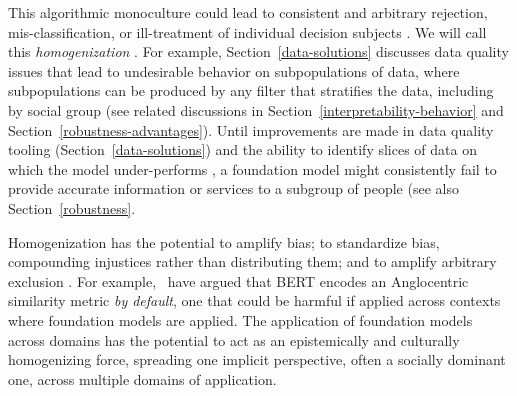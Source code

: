 This algorithmic monoculture \citep{kleinberg2021} could lead to consistent and arbitrary rejection, mis-classification, or ill-treatment of individual decision subjects \citep{Gandy2021}. We will call this \textit{homogenization} \citep{creel2021}. For example, Section~\ref{data-solutions} discusses data quality issues that lead to undesirable behavior on subpopulations of data, where subpopulations can be produced by any filter that stratifies the data, including by social group  (see related discussions in Section~\ref{interpretability-behavior} and Section~\ref{robustness-advantages}). 
Until improvements are made in data quality tooling (Section~\ref{data-solutions}) and the ability to identify slices of data on which the model under-performs  \citep{chung2019slice, goel2021robustnessgym}, a foundation model might consistently fail to provide accurate information or services to a subgroup of people (see also Section~\ref{robustness}.  

Homogenization has the potential to amplify bias; to standardize bias, compounding injustices rather than distributing them; and to amplify arbitrary exclusion \citep{creel2021, Gandy2021}. For example,~\citet{zhou2021} have argued that BERT encodes an Anglocentric similarity metric \textit{by default}, one that could be harmful if applied across contexts where foundation models are applied. The application of foundation models across domains has the potential to act as an epistemically and culturally homogenizing force, spreading one implicit perspective, often a socially dominant one, across multiple domains of application. 

